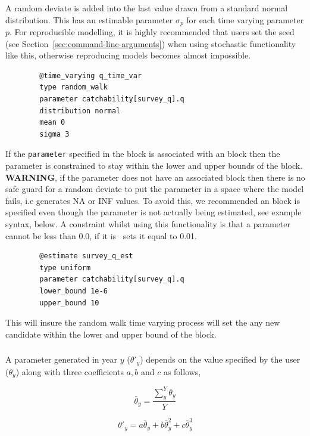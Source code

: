 A random deviate is added into the last value drawn from a standard normal distribution. This has an estimable parameter $\sigma_p$ for each time varying parameter $p$. For reproducible modelling, it is highly recommended that users set the seed (see Section~\ref{sec:command-line-arguments}) when using stochastic functionality like this, otherwise reproducing models becomes almost impossible.
{\small{\begin{verbatim}
		@time_varying q_time_var
		type random_walk
		parameter catchability[survey_q].q
		distribution normal
		mean 0
		sigma 3
		\end{verbatim}}}

If the \texttt{parameter} specified in the  block is associated with an  block then the parameter is constrained to stay within the lower and upper bounds of the  block. \textbf{WARNING}, if the parameter does not have an associated  block then there is no safe guard for a random deviate to put the parameter in a space where the model fails, i.e generates NA or INF values. To avoid this, we recommended an  block is specified even though the parameter is not actually being estimated, see example syntax, below. A constraint whilst using this functionality is that a parameter cannot be less than 0.0, if it is \CNAME\ sets it equal to 0.01.

{\small{\begin{verbatim}
		@estimate survey_q_est
		type uniform
		parameter catchability[survey_q].q
		lower_bound 1e-6
		upper_bound 10
		\end{verbatim}}}
This will insure the random walk time varying process will set the any new candidate within the lower and upper bound of the  block.

\subsubsection[Annual shift]{}

A parameter generated in year $y$ ($\theta'_y$) depends on the value specified by the user ($\theta_y$) along with three coefficients $a,b$ and $c$ as follows,

\begin{equation}
\bar{\theta}_y = \frac{\sum_{y}^Y\theta_y}{Y}
\end{equation}

\begin{equation}
\theta'_y = a \bar{\theta}_y + b\bar{\theta}_y^{2} + c\bar{\theta}_y^{3}
\end{equation}

